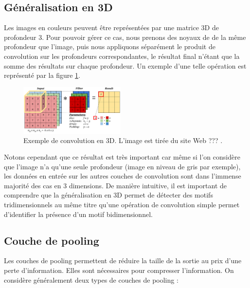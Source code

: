 \subsection{Généralisation en 3D}

Les images en couleurs peuvent être représentées par une matrice 3D de profondeur 3. Pour pouvoir gérer ce cas, nous prenons des noyaux de de la même profondeur que l'image, puis nous appliquons séparément le produit de convolution sur les profondeurs correspondantes, le résultat final n'étant que la somme des résultats sur chaque profondeur. Un exemple d'une telle opération est représenté par la figure \ref{CNN_3D}.

\begin{figure}[!h]
\centering
\includegraphics[width=150pt]{images/cnn/CNN_3D.png}
\caption{Exemple de convolution en 3D. L'image est tirée du site Web ??? \cite{3D_convolution}.}
\label{CNN_3D}
\end{figure}

Notons cependant que ce résultat est très important car même si l'on considère que l'image n'a qu'une seule profondeur (image en niveau de gris par exemple), les données en entrée sur les autres couches de convolution sont dans l'immense majorité des cas en 3 dimensions. De manière intuitive, il est important de comprendre que la généralisation en 3D permet de détecter des motifs tridimensionnels au même titre qu'une opération de convolution simple permet d'identifier la présence d'un motif bidimensionnel. 

\subsection{Couche de pooling}

Les couches de pooling permettent de réduire la taille de la sortie au prix d'une perte d'information. Elles sont nécessaires pour compresser l'information. On considère généralement deux types de couches de pooling :

